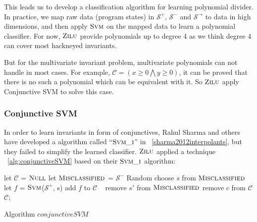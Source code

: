 This leads us to develop a classification algorithm for learning polynomial divider.
In practice, we map raw data (program states) in $\mathcal{S}^+$, $\mathcal{S}^-$ and $\mathcal{S}^\rightarrow$ to data in high dimensions, 
and then apply $\textsc{Svm}$ on the mapped data to learn a polynomial classifier. 
For now, $\textsc{Zilu}$ provide polynomials up to degree 4 as we think degree 4 can cover most hackneyed invariants.

But for the multivariate invariant problem, multivariate polynomials can not handle in most cases.
For example, $\mathcal{C} = (x \ge 0 \bigwedge y \ge 0)$,
it can be proved that there is no such a polynomial which can be equivalent with it.
So $\textsc{Zilu}$ apply Conjunctive SVM to solve this case.

\subsubsection{Conjunctive SVM}
In order to learn invariants in form of conjunctives, 
Rahul Sharma and others have developed a algorithm called ``$\textsc{Svm\_i}$'' in ~\ref{sharma2012interpolants},
but they failed to simplify the learned classifier.
$\textsc{Zilu}$ applied a technique ~\ref{alg:conjunctiveSVM} based on their $\textsc{Svm\_i}$ algorithm:

\begin{algorithm}[!h]
\SetAlgoVlined
\Indm
{}
\Indp
	let $\mathcal{C}$ = $\textsc{Null}$\;
	let $\textsc{Misclassified}$ = $\mathcal{S}^-$\;
	 {
		Random choose $s$ from $\textsc{Misclassified}$\;
	    let $f$ = $\textsc{Svm}$($\mathcal{S}^+$, s)\;
	    add $f$ to $\mathcal{C}$\;
	     {\
	    	 {
	    		remove $s'$ from $\textsc{Misclassified}$\;
	    	}
	    }
	}
	 {
		 {
			remove $c$ from $\mathcal{C}$\;
		}
	}
	\Return $\mathcal{C}$;
\caption{Algorithm $conjunctiveSVM$}
\label{alg:conjunctiveSVM}
\end{algorithm}




